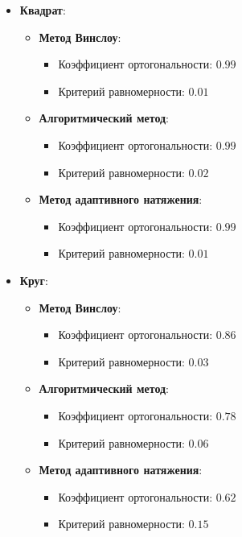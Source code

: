 \documentclass[a4paper,14pt,russian]{extreport}
\renewcommand{\_}{\kern-1.5pt\textunderscore\kern-1.5pt}
\begin{document}
\begin{itemize}
    \item \textbf{Квадрат}:
    \begin{itemize}
        \item \textbf{Метод Винслоу}:
        \begin{itemize}
            \item Коэффициент ортогональности: \(0.99\)
            \item Критерий равномерности: \(0.01\)
        \end{itemize}
        \item \textbf{Алгоритмический метод}:
        \begin{itemize}
            \item Коэффициент ортогональности: \(0.99\)
            \item Критерий равномерности: \(0.02\)
        \end{itemize}
        \item \textbf{Метод адаптивного натяжения}:
        \begin{itemize}
            \item Коэффициент ортогональности: \(0.99\)
            \item Критерий равномерности: \(0.01\)
        \end{itemize}
    \end{itemize}

    \item \textbf{Круг}:
    \begin{itemize}
        \item \textbf{Метод Винслоу}:
        \begin{itemize}
            \item Коэффициент ортогональности: \(0.86\)
            \item Критерий равномерности: \(0.03\)
        \end{itemize}
        \item \textbf{Алгоритмический метод}:
        \begin{itemize}
            \item Коэффициент ортогональности: \(0.78\)
            \item Критерий равномерности: \(0.06\)
        \end{itemize}
        \item \textbf{Метод адаптивного натяжения}:
        \begin{itemize}
            \item Коэффициент ортогональности: \(0.62\)
            \item Критерий равномерности: \(0.15\)
        \end{itemize}
    \end{itemize}


\end{itemize}
\end{document}
